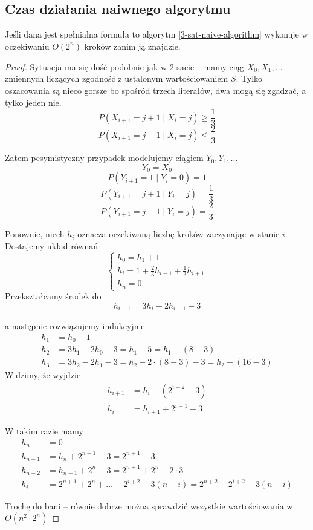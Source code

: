\subsection{Czas działania naiwnego algorytmu}
\begin{theorem}
	Jeśli dana jest spełnialna formuła to algorytm \ref{3-sat-naive-algorithm} wykonuje w oczekiwaniu \( O(2^n) \) kroków zanim ją znajdzie.
\end{theorem}
\begin{proof}

	Sytuacja ma się dość podobnie jak w 2-sacie -- mamy ciąg \( X_0, X_1, \dots \) zmiennych
	liczących zgodność z ustalonym wartościowaniem \( S \).
	Tylko oszacowania są nieco gorsze bo spośród trzech literałów, dwa mogą się zgadzać, a tylko jeden nie.
	\[
		P(X_{i+1} = j + 1 \mid X_i = j) \geq \frac{1}{3}
	\]
	\[
		P(X_{i+1} = j - 1 \mid X_i = j) \leq \frac{2}{3}
	\]

	Zatem pesymistyczny przypadek modelujemy ciągiem \( Y_0, Y_1, \dots \)
	\[
		Y_0 = X_0
	\]
	\[
		P(Y_{i+1} = 1 \mid Y_i = 0) = 1
	\]
	\[
		P(Y_{i+1} = j + 1 \mid Y_i = j) = \frac{1}{3}
	\]
	\[
		P(Y_{i+1} = j - 1 \mid Y_i = j) = \frac{2}{3}
	\]

	Ponownie, niech \( h_i \) oznacza oczekiwaną liczbę kroków zaczynając w stanie \( i \).
	Dostajemy układ równań
	\[
		\begin{cases}
			h_0 = h_1 + 1                                           \\
			h_i = 1 + \frac{2}{3} h_{i - 1} + \frac{1}{3} h_{i + 1} \\
			h_n = 0
		\end{cases}
	\]
	Przekształcamy środek do
	\[
		h_{i + 1} = 3h_i - 2h_{i - 1} - 3
	\]

	a następnie rozwiązujemy indukcyjnie
	\begin{align*}
		h_1 & = h_0 - 1                                                     \\
		h_2 & = 3h_1 - 2h_0 - 3 = h_1 - 5  = h_1 - (8 - 3)                  \\
		h_3 & = 3h_2 - 2h_1 - 3 = h_2 - 2 \cdot(8 - 3) - 3 = h_2 - (16 - 3)
	\end{align*}
	Widzimy, że wyjdzie
	\begin{align*}
		h_{i+1} & = h_i - (2^{i+2} - 3)   \\
		h_i     & = h_{i+1} + 2^{i+1} - 3
	\end{align*}

	W takim razie mamy
	\begin{align*}
		h_n     & = 0                                                                         \\
		h_{n-1} & = h_n + 2^{n+1} - 3 = 2^{n+1} - 3                                           \\
		h_{n-2} & = h_{n-1} + 2^n - 3 = 2^{n+1} + 2^n - 2\cdot 3                              \\
		h_i     & = 2^{n+1} + 2^n + \dots + 2^{i+2} - 3(n - i) = 2^{n+2} - 2^{i+2} - 3(n - i)
	\end{align*}

	Trochę do bani -- równie dobrze można sprawdzić wszystkie wartościowania w \( O(n^2 \cdot 2^n) \)
\end{proof}

